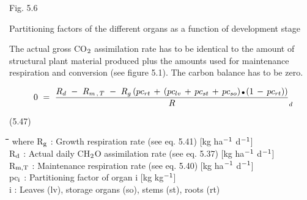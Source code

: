  
\begin{figure}[htbp]
\begin{forcewidth}{12.06cm}
 \begin{center} \end{center}
\end{forcewidth}
\end{figure}














Fig. 5.6
\testlastline

\begin{indenting}{2.54cm}
Parti\-tioning factors of the differ\-ent organs as a function of de\-velop\-ment
stage
\end{indenting}



The actual gross CO$_{{\rm 2}}$ assimilation rate has to be identical to the amount of structural plant
material produced plus the amounts used for maintenance respiration and conversion (see
figure 5.1). The carbon balance has to be zero. 

\begin{displaymath}
0~=~{\frac{R _{d} ~-~ R _{m\, ,\, T} ~-~ R _{g} \, (pc _{rt} \, +\, (pc _{lv} \, +\, pc _{st} \, +\, pc _{so} )\, {\rm \Bullet{0.75ex}}\, (1\, -\, pc _{rt} ))}{R}} _{d} 
\end{displaymath}

 
\strut\hfill (5.47)

\nwln
\begin{tabbing}
\hspace{1.27cm}\=\hspace{1.27cm}\=\hspace{1.27cm}\=\hspace{1.27cm}\=%
\hspace{1.27cm}\=\hspace{1.27cm}\=\hspace{1.27cm}\=\hspace{1.27cm}\=%
\hspace{1.27cm}\=\hspace{1.27cm}\=\kill
where R$_{{\rm g}}$ : Growth respiration rate (see eq. 5.41)        [kg ha$^{{\rm -1}}$ d$^{{\rm -1}}$]\\
R$_{{\rm d}}$ : Actual daily CH$_{{\rm 2}}$O assimilation rate (see eq. 5.37)        [kg ha$^{{\rm -1}}$ d$^{{\rm -1}}$]\\
R$_{{\rm m,T}}$ : Maintenance respiration rate (see eq. 5.40)        [kg ha$^{{\rm -1}}$ d$^{{\rm -1}}$]\\
pc$_{{\rm i}}$ : Partitioning factor of organ i        [kg kg$^{{\rm -1}}$]\\
i : Leaves (lv), storage organs (so), stems (st), roots (rt)
\end{tabbing}

